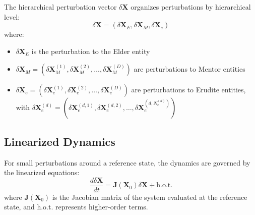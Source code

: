 \begin{definition}
The hierarchical perturbation vector $\delta\mathbf{X}$ organizes perturbations by hierarchical level:
\begin{equation}
\delta\mathbf{X} = (\delta\mathbf{X}_E, \delta\mathbf{X}_M, \delta\mathbf{X}_e)
\end{equation}
where:
\begin{itemize}
    \item $\delta\mathbf{X}_E$ is the perturbation to the Elder entity
    \item $\delta\mathbf{X}_M = (\delta\mathbf{X}_M^{(1)}, \delta\mathbf{X}_M^{(2)}, \ldots, \delta\mathbf{X}_M^{(D)})$ are perturbations to Mentor entities
    \item $\delta\mathbf{X}_e = (\delta\mathbf{X}_e^{(1)}, \delta\mathbf{X}_e^{(2)}, \ldots, \delta\mathbf{X}_e^{(D)})$ are perturbations to Erudite entities, with $\delta\mathbf{X}_e^{(d)} = (\delta\mathbf{X}_e^{(d,1)}, \delta\mathbf{X}_e^{(d,2)}, \ldots, \delta\mathbf{X}_e^{(d,N_e^{(d)})})$
\end{itemize}
\end{definition}

\subsection{Linearized Dynamics}

\begin{theorem}
For small perturbations around a reference state, the dynamics are governed by the linearized equations:
\begin{equation}
\frac{d\delta\mathbf{X}}{dt} = \mathbf{J}(\mathbf{X}_0) \delta\mathbf{X} + \text{h.o.t.}
\end{equation}
where $\mathbf{J}(\mathbf{X}_0)$ is the Jacobian matrix of the system evaluated at the reference state, and h.o.t. represents higher-order terms.
\end{theorem}


